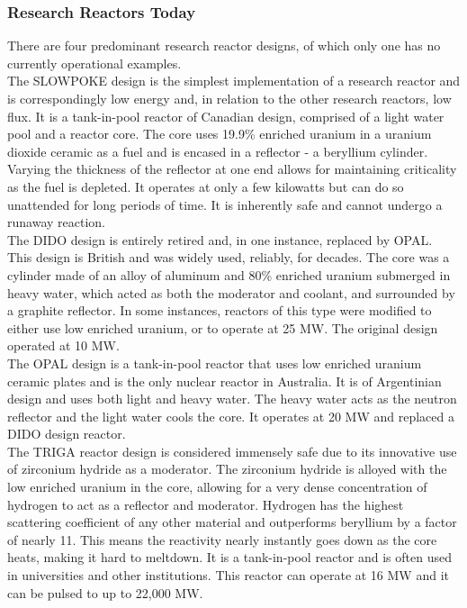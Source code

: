 \subsubsection{Research Reactors Today}

There are four predominant research reactor designs, of which only one has no currently operational examples.\\

The SLOWPOKE design is the simplest implementation of a research reactor and is correspondingly low energy and, in relation to the other research reactors, low flux. It is a tank-in-pool reactor of Canadian design, comprised of a light water pool and a reactor core. The core uses 19.9\% enriched uranium in a uranium dioxide ceramic as a fuel and is encased in a reflector - a beryllium cylinder. Varying the thickness of the reflector at one end allows for maintaining criticality as the fuel is depleted. It operates at only a few kilowatts but can do so unattended for long periods of time. It is inherently safe and cannot undergo a runaway reaction.\\

The DIDO design is entirely retired and, in one instance, replaced by OPAL. This design is British and was widely used, reliably, for decades. The core was a cylinder made of an alloy of aluminum and 80\% enriched uranium submerged in heavy water, which acted as both the moderator and coolant, and surrounded by a graphite reflector. In some instances, reactors of this type were modified to either use low enriched uranium, or to operate at 25 MW. The original design operated at 10 MW.\\

The OPAL design is a tank-in-pool reactor that uses low enriched uranium ceramic plates and is the only nuclear reactor in Australia. It is of Argentinian design and uses both light and heavy water. The heavy water acts as the neutron reflector and the light water cools the core. It operates at 20 MW and replaced a DIDO design reactor.\\

The TRIGA reactor design is considered immensely safe due to its innovative use of zirconium hydride as a moderator. The zirconium hydride is alloyed with the low enriched uranium in the core, allowing for a very dense concentration of hydrogen to act as a reflector and moderator. Hydrogen has the highest scattering coefficient of any other material and outperforms beryllium by a factor of nearly 11. This means the reactivity nearly instantly goes down as the core heats, making it hard to meltdown. It is a tank-in-pool reactor and is often used in universities and other institutions. This reactor can operate at 16 MW and it can be pulsed to up to 22,000 MW.

